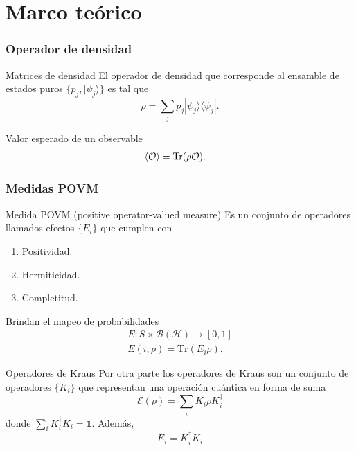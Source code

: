 \documentclass[svgnames,12pt,aspectratio=149]{beamer}
\newcommand{\E}{\mathcal{E}}
\begin{document}






\section{Marco teórico}
\begin{frame}
 \frametitle{Operador de densidad}
 
 \begin{block}{Matrices de densidad}
  El operador de densidad que corresponde al ensamble de estados puros $ \{p_j,|\psi_j\rangle\}$ es tal que \[\rho=\sum_j p_j |\psi_j\rangle\langle\psi_j|.\]

 \end{block}
 Valor esperado de un observable 
 \begin{equation*}
  \label{expectationvalue_traza}
  \begin{split}
    \langle \mathcal{O} \rangle &= \rm{Tr}(\rho \mathcal{O}).
  \end{split}
\end{equation*}

\end{frame}

\begin{frame}
\frametitle{Medidas POVM}
    \begin{block}{Medida POVM (positive operator-valued measure) }
      Es un conjunto de operadores llamados efectos $\{E_i\}$ que cumplen con 
\begin{enumerate}
    \item Positividad.
    \item Hermiticidad.
    \item  Completitud.
\end{enumerate}
    \end{block}
  Brindan el mapeo de probabilidades \begin{equation*}\begin{split}
      E:S\times \mathcal{B(H)}\longrightarrow [0,1]\\
      E (i,\rho)=\text{Tr}(E_i\rho).
  \end{split}\end{equation*}


\end{frame}

\begin{frame}{Operadores de Kraus}
  Por otra parte los operadores de Kraus son un conjunto de operadores $\{K_i\} $ que representan una operación cuántica en forma de suma \begin{equation*}
    \E(\rho)=\sum_i K_i\rho K_i^\dagger \end{equation*}
  donde $\sum_{i}K_i^\dagger K_i=\mathds{1}$. Además, \[E_i=K_i^\dagger K_i\]
\end{frame}
\end{document}
